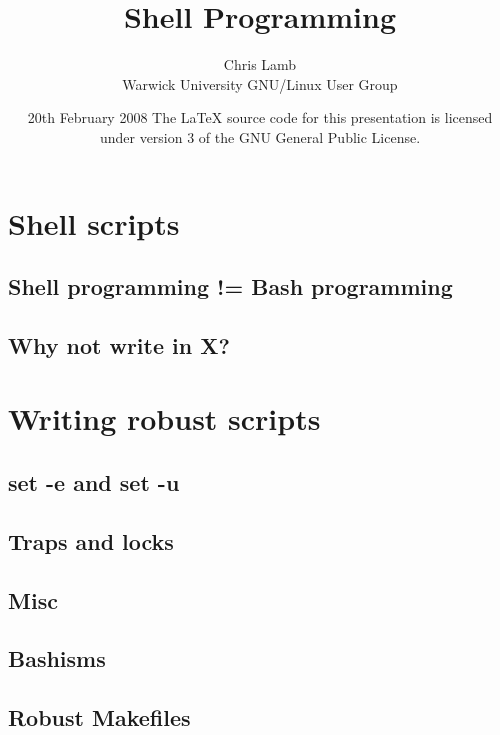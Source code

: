 \documentclass{beamer}
\title{Shell Programming}
\author[Chris Lamb, WUGLUG]{Chris Lamb\\Warwick University GNU/Linux User Group}
\date{20th February 2008
\newline
\newline
\tiny{The \LaTeX{} source code for this presentation is licensed under version 3 of the GNU General Public License.}}
\begin{document}
\frame{\titlepage}

%

\section{Shell scripts}
\subsection{Shell programming != Bash programming}

\subsection{Why not write in X?}

%

\section{Writing robust scripts}
\subsection{set -e and set -u}
\subsection{Traps and locks}
\subsection{Misc}
\subsection{Bashisms}

\subsection{Robust Makefiles}
\end{document}
